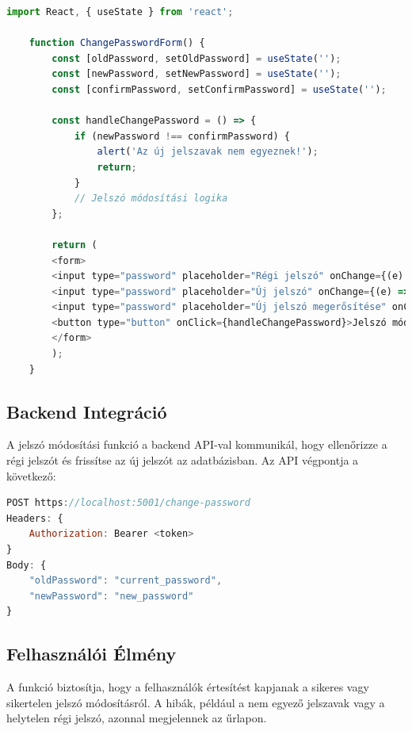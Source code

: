 \documentclass[colorlinks]{thesis-kando}
\theoremstyle{definition}
\theoremstyle{remark}
\begin{document}
\begin{lstlisting}[language=JavaScript]
    import React, { useState } from 'react';

    function ChangePasswordForm() {
        const [oldPassword, setOldPassword] = useState('');
        const [newPassword, setNewPassword] = useState('');
        const [confirmPassword, setConfirmPassword] = useState('');

        const handleChangePassword = () => {
            if (newPassword !== confirmPassword) {
                alert('Az új jelszavak nem egyeznek!');
                return;
            }
            // Jelszó módosítási logika
        };

        return (
        <form>
        <input type="password" placeholder="Régi jelszó" onChange={(e) => setOldPassword(e.target.value)} />
        <input type="password" placeholder="Új jelszó" onChange={(e) => setNewPassword(e.target.value)} />
        <input type="password" placeholder="Új jelszó megerősítése" onChange={(e) => setConfirmPassword(e.target.value)} />
        <button type="button" onClick={handleChangePassword}>Jelszó módosítása</button>
        </form>
        );
    }
\end{lstlisting}

\subsection{Backend Integráció}
A jelszó módosítási funkció a backend API-val kommunikál, hogy ellenőrizze a régi jelszót és frissítse az új jelszót az adatbázisban. Az API végpontja a következő:

\begin{lstlisting}[language=JavaScript]
POST https://localhost:5001/change-password
Headers: {
    Authorization: Bearer <token>
}
Body: {
    "oldPassword": "current_password",
    "newPassword": "new_password"
}
\end{lstlisting}

\subsection{Felhasználói Élmény}
A funkció biztosítja, hogy a felhasználók értesítést kapjanak a sikeres vagy sikertelen jelszó módosításról. A hibák, például a nem egyező jelszavak vagy a helytelen régi jelszó, azonnal megjelennek az űrlapon.
\end{document}
